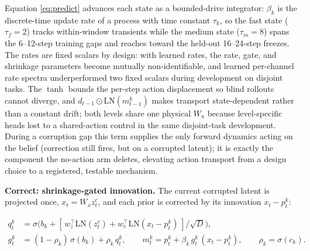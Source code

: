 Equation \ref{eq:predict} advances each state as a bounded-drive
integrator: \(\beta_k\) is the discrete-time update rate of a process
with time constant \(\tau_k\), so the fast state (\(\tau_f=2\))
tracks within-window transients while the medium state (\(\tau_m=8\))
spans the 6--12-step training gaps and reaches toward the held-out
16--24-step freezes. The rates are fixed scalars by design: with learned
rates, the rate, gate, and shrinkage parameters become mutually
non-identifiable, and learned per-channel rate spectra underperformed
two fixed scalars during development on disjoint tasks. The
\(\tanh\) bounds the per-step action displacement so blind rollouts
cannot diverge, and \(d_{t-1}\odot\mathrm{LN}(m_{t-1}^k)\) makes transport state-dependent rather
than a constant drift; both levels share one physical \(W_a\)
because level-specific heads lost to a shared-action control in the same
disjoint-task development. During a corruption gap this term supplies
the only forward dynamics acting on the belief (correction still fires,
but on a corrupted latent); it is exactly the component the no-action
arm deletes, elevating action transport from a design choice to a
registered, testable mechanism.

\textbf{Correct: shrinkage-gated innovation.} The current corrupted
latent is projected once, \(x_t=W_xz_t^c\), and each prior is corrected by
its innovation \(x_t-p_t^k\):

\begin{equation}\begin{aligned}
q_t^k&=\sigma\!\big(b_k+[\,w_z^\top\mathrm{LN}(z_t^c)+w_e^\top\mathrm{LN}(x_t-p_t^k)\,]/\sqrt D\big),\\
g_t^k&=(1-\rho_k)\,\sigma(b_k)+\rho_k\,q_t^k,\qquad
m_t^k=p_t^k+\beta_k\,g_t^k\,(x_t-p_t^k),\qquad \rho_k=\sigma(c_k).
\end{aligned}
\label{eq:correct}\end{equation}

